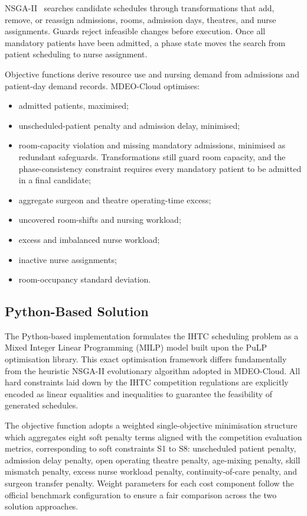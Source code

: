\documentclass[11pt,a4paper]{article}
\begin{document}
NSGA-II~\cite{deb2002nsga2} searches candidate schedules through transformations that add, remove, or reassign admissions, rooms, admission days, theatres, and nurse assignments. Guards reject infeasible changes before execution. Once all mandatory patients have been admitted, a phase state moves the search from patient scheduling to nurse assignment.

Objective functions derive resource use and nursing demand from admissions and patient-day demand records. MDEO-Cloud optimises:

\begin{itemize}
    \item admitted patients, maximised;
    \item unscheduled-patient penalty and admission delay, minimised;
    \item room-capacity violation and missing mandatory admissions, minimised as redundant safeguards. Transformations still guard room capacity, and the phase-consistency constraint requires every mandatory patient to be admitted in a final candidate;
    \item aggregate surgeon and theatre operating-time excess;
    \item uncovered room-shifts and nursing workload;
    \item excess and imbalanced nurse workload;
    \item inactive nurse assignments;
    \item room-occupancy standard deviation.
\end{itemize}

\subsection{Python-Based Solution}
The Python-based implementation formulates the IHTC scheduling problem as a Mixed Integer Linear Programming (MILP) model built upon the PuLP optimisation library. This exact optimisation framework differs fundamentally from the heuristic NSGA-II evolutionary algorithm adopted in MDEO-Cloud. All hard constraints laid down by the IHTC competition regulations are explicitly encoded as linear equalities and inequalities to guarantee the feasibility of generated schedules.

The objective function adopts a weighted single-objective minimisation structure which aggregates eight soft penalty terms aligned with the competition evaluation metrics, corresponding to soft constraints S1 to S8: unscheduled patient penalty, admission delay penalty, open operating theatre penalty, age-mixing penalty, skill mismatch penalty, excess nurse workload penalty, continuity-of-care penalty, and surgeon transfer penalty. Weight parameters for each cost component follow the official benchmark configuration to ensure a fair comparison across the two solution approaches.
\end{document}
